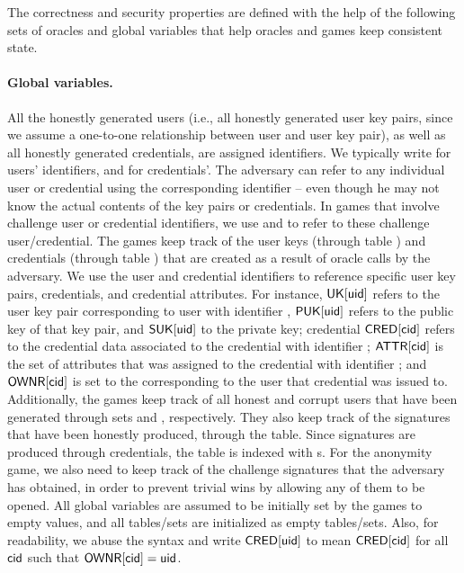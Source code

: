 The correctness and security properties are defined with the help of the
following sets of oracles and global variables that help oracles and games
keep consistent state.

\paragraph{Global variables.} %
All the honestly generated users (i.e., all honestly generated user key pairs,
since we assume a one-to-one relationship between user and user key pair), as
well as all honestly generated credentials, are assigned identifiers. We
typically write \uid for users' identifiers, and \cid for credentials'. The
adversary can
refer to any individual user or credential using the corresponding identifier --
even though he may not know the actual contents of the key pairs or credentials.
In games that involve challenge user or credential identifiers, we use \cuid and
\ccid to refer to these challenge user/credential.
%
The games keep track of the user keys (through table \UK) and credentials (through
table \CRED) that are created as a result of oracle calls by the adversary. We
use the user and credential identifiers to reference specific user key pairs,
credentials, and credential attributes.
For instance, $\mathsf{UK}[\mathsf{uid}]$ refers to the user key pair corresponding to user
with identifier \uid, $\mathsf{P}\mathsf{UK}[\mathsf{uid}]$ refers to the public key of that key pair,
and $\mathsf{S}\mathsf{UK}[\mathsf{uid}]$ to the private key; credential $\mathsf{CRED}[\mathsf{cid}]$ refers to the
credential data associated to the credential with identifier \cid; $\mathsf{ATTR}[\mathsf{cid}]$
is the set of attributes that was assigned to the credential with identifier
\cid; and $\mathsf{OWNR}[\mathsf{cid}]$ is set to the \uid corresponding to the user that
credential \cid was issued to.
%
Additionally, the games keep track of all honest and corrupt users that have
been generated through sets \HU and \CU, respectively. They also keep track of
the signatures that have been honestly produced, through the \SIG table. Since
signatures are produced through credentials, the \SIG table is indexed with
{\cid}s. For the anonymity game, we also need to keep track of the challenge
signatures that the adversary has obtained, in order to prevent trivial wins
by allowing any of them to be opened. 
%
All global variables are assumed to be initially set by the games to empty
values, and all tables/sets are initialized as empty tables/sets. Also, for
readability, we abuse the syntax and
write $\mathsf{CRED}[\mathsf{uid}]$ to mean $\mathsf{CRED}[\mathsf{cid}]$ for all $\mathsf{cid}$ such that
$\mathsf{OWNR}[\mathsf{cid}] = \mathsf{uid}$.%

